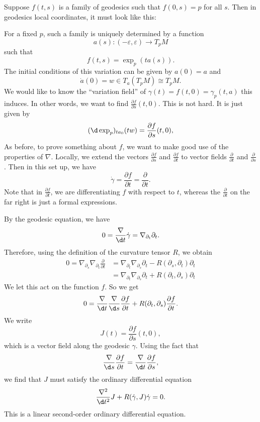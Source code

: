 \documentclass[a4paper]{article}
\begin{document}
Suppose $f(t, s)$ is a family of geodesics such that $f(0, s) = p$ for all $s$. Then in geodesics local coordinates, it must look like this:
\begin{center}
\end{center}
For a fixed $p$, such a family is uniquely determined by a function
\[
  a(s): (-\varepsilon, \varepsilon) \to T_p M
\]
such that
\[
  f(t, s) = \exp_p(t a(s)).
\]
The initial conditions of this variation can be given by $a(0) = a$ and
\[
  \dot{a}(0) = w \in T_a(T_p M) \cong T_p M.
\]
We would like to know the ``variation field'' of $\gamma(t) = f(t, 0) = \gamma_p(t, a)$ this induces. In other words, we want to find $\frac{\partial f}{\partial s} (t, 0)$. This is not hard. It is just given by
\[
  (\d \exp_p)_{t a_0} (tw) = \frac{\partial f}{\partial s}(t, 0),
\]
As before, to prove something about $f$, we want to make good use of the properties of $\nabla$. Locally, we extend the vectors $\frac{\partial f}{\partial s}$ and $\frac{\partial f}{\partial t}$ to vector fields $\frac{\partial}{\partial t}$ and $\frac{\partial}{\partial s}$. Then in this set up, we have
\[
  \dot{\gamma} = \frac{\partial f}{\partial t} = \frac{\partial}{\partial t}.
\]
Note that in $\frac{\partial f}{\partial t}$, we are differentiating $f$ with respect to $t$, whereas the $\frac{\partial}{\partial t}$ on the far right is just a formal expressions.

By the geodesic equation, we have
\[
  0 = \frac{\nabla}{\d t} \dot{\gamma} = \nabla_{\partial_t} \partial_t.
\]
Therefore, using the definition of the curvature tensor $R$, we obtain
\begin{align*}
  0 = \nabla_{\partial_s} \nabla_{\partial_t} \frac{\partial}{\partial t} &= \nabla_{\partial_t} \nabla_{\partial_s} \partial_t - R(\partial_s, \partial_t) \partial_t\\
  &= \nabla_{\partial_t} \nabla_{\partial_s} \partial_t + R(\partial_t, \partial_s) \partial_t
\end{align*}
We let this act on the function $f$. So we get
\[
  0 = \frac{\nabla}{\d t} \frac{\nabla}{\d s} \frac{\partial f}{\partial t} + R(\partial_t, \partial_s) \frac{\partial f}{\partial t}.
\]
We write
\[
  J(t) = \frac{\partial f}{\partial s}(t, 0),
\]
which is a vector field along the geodesic $\gamma$. Using the fact that
\[
  \frac{\nabla}{\d s} \frac{\partial f}{\partial t} = \frac{\nabla}{\d t} \frac{\partial f}{\partial s},
\]
we find that $J$ must satisfy the ordinary differential equation
\[
  \frac{\nabla^2}{\d t^2} J + R(\dot{\gamma}, J) \dot{\gamma} = 0.
\]
This is a linear second-order ordinary differential equation.
\end{document}
